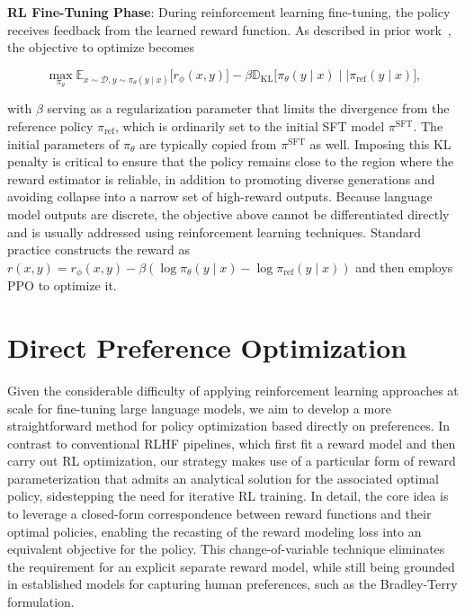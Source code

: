 \textbf{RL Fine-Tuning Phase}: During reinforcement learning fine-tuning, the policy receives feedback from the learned reward function. As described in prior work~\citep{jaques2017sequence, jaques2020human}, the objective to optimize becomes

\begin{equation}\label{eq:RL}
\max_{\pi_{\theta}}  \mathbb{E}_{x\sim \mathcal{D}, y\sim \pi_{\theta}(y \mid x)}\bigl[r_{\phi}(x, y)\bigr] - \beta\mathbb{D}_{\textrm{KL}}\bigl[\pi_{\theta}(y\mid x)\mid \mid \pi_\text{ref}(y\mid x)\bigr],
\end{equation}

with $\beta$ serving as a regularization parameter that limits the divergence from the reference policy $\pi_\text{ref}$, which is ordinarily set to the initial SFT model $\pi^\text{SFT}$. The initial parameters of $\pi_\theta$ are typically copied from $\pi^\text{SFT}$ as well. Imposing this KL penalty is critical to ensure that the policy remains close to the region where the reward estimator is reliable, in addition to promoting diverse generations and avoiding collapse into a narrow set of high-reward outputs. Because language model outputs are discrete, the objective above cannot be differentiated directly and is usually addressed using reinforcement learning techniques. Standard practice \citep{ziegler2020finetuning, stiennon2022learning, bai2022training, ouyang2022training} constructs the reward as ${r(x, y) = r_{\phi}(x, y) -\beta (\log \pi_{\theta}(y\mid x) - \log \pi_\text{ref}(y\mid x))}$ and then employs PPO \cite{schulman2017proximal} to optimize it.

\section{Direct Preference Optimization}\label{sec:DPO}

Given the considerable difficulty of applying reinforcement learning approaches at scale for fine-tuning large language models, we aim to develop a more straightforward method for policy optimization based directly on preferences. In contrast to conventional RLHF pipelines, which first fit a reward model and then carry out RL optimization, our strategy makes use of a particular form of reward parameterization that admits an analytical solution for the associated optimal policy, sidestepping the need for iterative RL training. In detail, the core idea is to leverage a closed-form correspondence between reward functions and their optimal policies, enabling the recasting of the reward modeling loss into an equivalent objective for the policy. This change-of-variable technique eliminates the requirement for an explicit separate reward model, while still being grounded in established models for capturing human preferences, such as the Bradley-Terry formulation.

